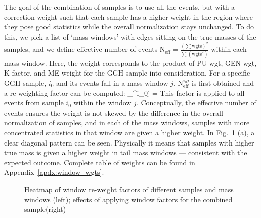 The goal of the combination of samples is to use all the events, but with a correction weight
such that each sample has a higher weight in the region where they pose good statistics
while the overall normalization stays unchanged. To do this, we pick a list of
`mass windows' with edges sitting on the true masses of the samples, and we define effective
number of events $\mathrm{N}_\mathrm{eff} = \frac{(\sum\mathrm{wgts})^2}{\sum(\mathrm{wgts}^2)}$
within each mass window. Here, the weight corresponds to the product of PU wgt, GEN wgt, K-factor, 
and ME weight for
the GGH sample into consideration. For a specific GGH sample, $i_0$ and its events fall in a mass 
window $j$, $\mathrm{N}_\mathrm{eff}^{i_0j}$ is first obtained and a re-weighting factor can be computed:
\be
{}_^{i_0j} = 
\ee
This factor is applied to all events from sample $i_0$ within the window $j$. Conceptually,
the effective number of events ensures the weight is not skewed by the difference in the overall
normalization of samples, and in each of the mass windows, samples with more concentrated
statistics in that window are given a higher weight. In Fig.~\ref{fig:window_wgt_matrix} (a), a
clear diagonal pattern can be seen. Physically it means that samples with higher true 
mass is given a higher weight in tail mass windows --- consistent with the expected outcome. Complete
table of weights can be found in Appendix~\ref{apdx:window_wgts}.
\begin{figure}[htb]
    \begin{center}
    \end{center}
    \caption{Heatmap of window re-weight factors of different samples and mass windows (left);
    effects of applying window factors for the combined sample(right)}
    \label{fig:window_wgt_matrix}
\end{figure}

